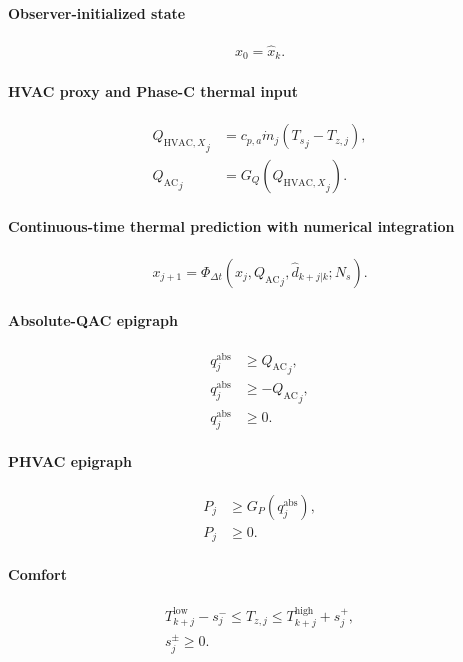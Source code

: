 \documentclass[11pt]{article}
\newcommand{\Ts}{T_s}
\newcommand{\mdot}{\dot m}
\newcommand{\QAC}{Q_{\mathrm{AC}}}
\newcommand{\QHX}{Q_{\mathrm{HVAC},X}}
\begin{document}
\paragraph{Observer-initialized state}
\begin{align}
x_0=\widehat x_k.
\tag{6.68}
\end{align}

\paragraph{HVAC proxy and Phase-C thermal input}
\begin{align}
{\QHX}_j
&=
c_{p,a}\mdot_j({\Ts}_j-T_{z,j}),
\\
{\QAC}_j
&=
G_Q({\QHX}_j).
\tag{6.69}
\end{align}

\paragraph{Continuous-time thermal prediction with numerical integration}
\begin{align}
x_{j+1}
=
\Phi_{\Delta t}
\left(
x_j,{\QAC}_j,\widehat d_{k+j|k};N_s
\right).
\tag{6.70}
\end{align}

\paragraph{Absolute-QAC epigraph}
\begin{align}
q_j^{\mathrm{abs}}&\ge{\QAC}_j,
\\
q_j^{\mathrm{abs}}&\ge-{\QAC}_j,
\\
q_j^{\mathrm{abs}}&\ge0.
\tag{6.71}
\end{align}

\paragraph{PHVAC epigraph}
\begin{align}
P_j&\ge G_P(q_j^{\mathrm{abs}}),
\\
P_j&\ge0.
\tag{6.72}
\end{align}

\paragraph{Comfort}
\begin{align}
T^{\mathrm{low}}_{k+j}-s_j^-
\le
T_{z,j}
\le
T^{\mathrm{high}}_{k+j}+s_j^+,
\\
s_j^\pm\ge0.
\tag{6.73}
\end{align}
\end{document}
